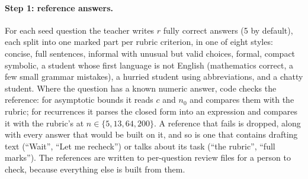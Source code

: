 \documentclass[11pt,a4paper]{article}
\theoremstyle{definition}
\begin{document}
\paragraph{Step 1: reference answers.}
For each seed question the teacher writes $r$ fully correct answers (5 by default), each split into one marked part per rubric criterion, in one of eight styles: concise, full sentences, informal with unusual but valid choices, formal, compact symbolic, a student whose first language is not English (mathematics correct, a few small grammar mistakes), a hurried student using abbreviations, and a chatty student. Where the question has a known numeric answer, code checks the reference: for asymptotic bounds it reads $c$ and $n_0$ and compares them with the rubric; for recurrences it parses the closed form into an expression and compares it with the rubric's at $n \in \{5, 13, 64, 200\}$. A reference that fails is dropped, along with every answer that would be built on it, and so is one that contains drafting text (``Wait'', ``Let me recheck'') or talks about its task (``the rubric'', ``full marks''). The references are written to per-question review files for a person to check, because everything else is built from them.
\end{document}
